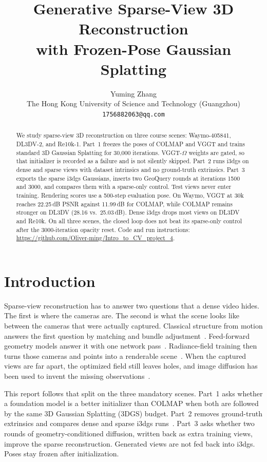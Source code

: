 \documentclass[10pt,twocolumn,letterpaper]{article}
\title{Generative Sparse-View 3D Reconstruction\\
with Frozen-Pose Gaussian Splatting}
\author{Yuming Zhang\\
The Hong Kong University of Science and Technology (Guangzhou)\\
{\tt\small 1756882063@qq.com}
}
\begin{document}
\maketitle

\begin{abstract}
We study sparse-view 3D reconstruction on three course scenes: Waymo-405841, DL3DV-2, and Re10k-1.
Part~1 freezes the poses of COLMAP and VGGT and trains standard 3D Gaussian Splatting for 30{,}000 iterations.
VGGT-$\Omega$ weights are gated, so that initializer is recorded as a failure and is not silently skipped.
Part~2 runs i3dgs on dense and sparse views with dataset intrinsics and no ground-truth extrinsics.
Part~3 exports the sparse i3dgs Gaussians, inserts two GeoQuery rounds at iterations 1500 and 3000, and compares them with a sparse-only control.
Test views never enter training.
Rendering scores use a 500-step evaluation pose.
On Waymo, VGGT at 30k reaches 22.25\,dB PSNR against 11.99\,dB for COLMAP, while COLMAP remains stronger on DL3DV (28.16 vs.\ 25.03\,dB).
Dense i3dgs drops most views on DL3DV and Re10k.
On all three scenes, the closed loop does not beat its sparse-only control after the 3000-iteration opacity reset.
Code and run instructions: \url{https://github.com/Oliver-ming/Intro_to_CV_project_4}.
\end{abstract}

\section{Introduction}
Sparse-view reconstruction has to answer two questions that a dense video hides.
The first is where the cameras are.
The second is what the scene looks like between the cameras that were actually captured.
Classical structure from motion answers the first question by matching and bundle adjustment~\cite{agarwal2011rome}.
Feed-forward geometry models answer it with one network pass~\cite{wang2025vggt,wang2026omega,lin2025da3}.
Radiance-field training then turns those cameras and points into a renderable scene~\cite{kerbl20233dgs}.
When the captured views are far apart, the optimized field still leaves holes, and image diffusion has been used to invent the missing observations~\cite{cao2026geoquery,wu2025difix,wu2025genfusion,yin2025gsfixer,zhao2026brpo}.

This report follows that split on the three mandatory scenes.
Part~1 asks whether a foundation model is a better initializer than COLMAP when both are followed by the same 3D Gaussian Splatting (3DGS) budget.
Part~2 removes ground-truth extrinsics and compares dense and sparse i3dgs runs~\cite{meuleman2026i3dgs}.
Part~3 asks whether two rounds of geometry-conditioned diffusion, written back as extra training views, improve the sparse reconstruction.
Generated views are not fed back into i3dgs.
Poses stay frozen after initialization.
\end{document}
